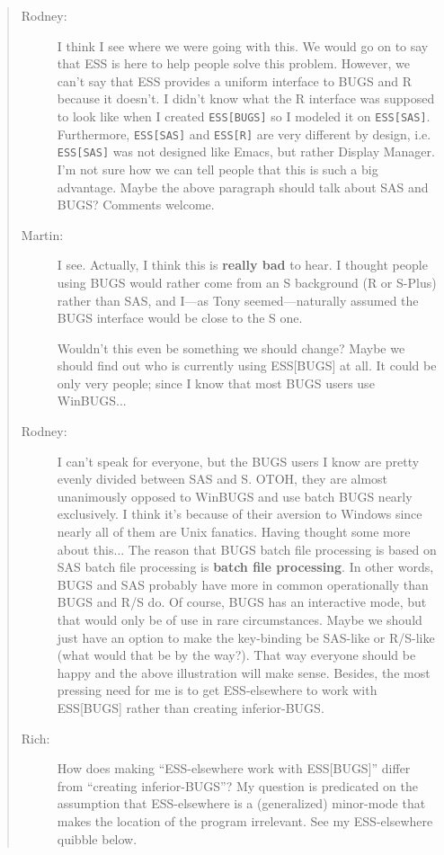 \documentclass{article}
\newcommand{\stexttt}[1]{{\small\texttt{#1}}}
\newenvironment{Comment}{\begin{quote}\small\itshape }{\end{quote}}
\begin{document}
\begin{Comment}
\begin{description}
 \item[Rodney:]  I think I see where we were going with this.  We would go on to
say that ESS is here to help people solve this problem.  However,
we can't say that ESS provides a uniform interface to BUGS and R because
it doesn't.  I didn't know what the R interface was supposed to look like
when I created \stexttt{ESS[BUGS]} so I modeled it on \stexttt{ESS[SAS]}.  Furthermore,
\stexttt{ESS[SAS]} and \stexttt{ESS[R]} are very different by design, i.e. \stexttt{ESS[SAS]} was not
designed like Emacs, but rather Display Manager.  I'm not sure how we can tell
people that this is such a big advantage.  Maybe the above paragraph
should talk about SAS and BUGS?  Comments welcome.

\item[Martin:] I see. Actually, I think this is \textbf{really bad} to hear.
  I thought people using BUGS would rather come from an S background
  (R or S-Plus) rather than SAS, and I---as Tony seemed---naturally
  assumed the BUGS interface would be close to the S one.

  Wouldn't this even be something we should change?  Maybe we should find
  out who is currently using ESS[BUGS] at all. It could be only very
  people; since I know that most BUGS users use WinBUGS...

\item[Rodney:]  I can't speak for everyone, but the BUGS users I know are
pretty evenly divided between SAS and S.  OTOH, they are almost 
unanimously opposed to WinBUGS and use batch BUGS nearly exclusively.
I think it's because of their aversion to Windows since nearly all of
them are Unix fanatics.  
Having thought some more about this...  The reason that BUGS batch file
processing is based on SAS batch file processing is \textbf{batch file processing}.
In other words, BUGS and SAS probably have more in common operationally
than BUGS and R/S do.  Of course, BUGS has an interactive mode, but that
would only be of use in rare circumstances.  Maybe we should just have an 
option to make the key-binding be SAS-like or R/S-like (what would that be 
by the way?).  That way everyone should be happy and the above illustration
will make sense.  Besides, the most pressing need for me is to get 
ESS-elsewhere to work with ESS[BUGS] rather than creating inferior-BUGS.

\item[Rich:] How does making ``ESS-elsewhere work with ESS[BUGS]'' differ
from ``creating inferior-BUGS''?  My question is predicated on the assumption
that ESS-elsewhere is a (generalized) minor-mode that makes the location
of the program irrelevant.
See my ESS-elsewhere quibble below.


\end{description}
\end{Comment}
\end{document}
